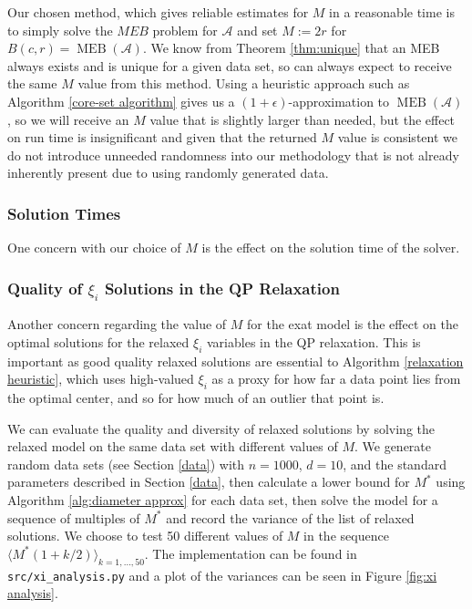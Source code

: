 \documentclass[11pt,twoside]{report}
\newcommand{\A}{\mathcal{A}} %
\DeclareMathOperator{\MEB}{MEB}
\theoremstyle{definition}
\numberwithin{theorem}{section}
\numberwithin{definition}{section}
\numberwithin{lemma}{section}
\numberwithin{proposition}{section}
\numberwithin{equation}{section}
\numberwithin{figure}{section}
\begin{document}
Our chosen method, which gives reliable estimates for $M$ in a reasonable time is to simply solve the $MEB$ problem for $\A$ and set $M:=2r$ for $B(c,r)=\MEB(\A)$. We know from Theorem \ref{thm:unique} that an MEB always exists and is unique for a given data set, so can always expect to receive the same $M$ value from this method. Using a heuristic approach such as Algorithm \ref{core-set algorithm} gives us a $(1+\epsilon)$-approximation to $\MEB(\A)$, so we will receive an $M$ value that is slightly larger than needed, but the effect on run time is insignificant and given that the returned $M$ value is consistent we do not introduce unneeded randomness into our methodology that is not already inherently present due to using randomly generated data.

\subsubsection{Solution Times}
One concern with our choice of $M$ is the effect on the solution time of the solver.

\subsubsection{Quality of $\xi_i$ Solutions in the QP Relaxation}
Another concern regarding the value of $M$ for the exat model is the effect on the optimal solutions for the relaxed $\xi_i$ variables in the QP relaxation. This is important as good quality relaxed solutions are essential to Algorithm \ref{relaxation heuristic}, which uses high-valued $\xi_i$ as a proxy for how far a data point lies from the optimal center, and so for how much of an outlier that point is.

We can evaluate the quality and diversity of relaxed solutions by solving the relaxed model on the same data set with different values of $M$. We generate random data sets (see Section \ref{data}) with $n=1000$, $d=10$, and the standard parameters described in Section \ref{data}, then calculate a lower bound for $M^*$ using Algorithm \ref{alg:diameter approx} for each data set, then solve the model for a sequence of multiples of $M^*$ and record the variance of the list of relaxed solutions. We choose to test 50 different values of $M$ in the sequence $\langle M^*(1+k/2)\rangle _{k=1,\ldots,50}$. The implementation can be found in \texttt{src/xi\_analysis.py} and a plot of the variances can be seen in Figure \ref{fig:xi analysis}.
\end{document}
